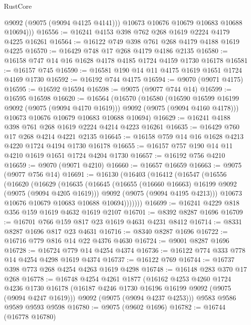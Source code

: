 \begin{lexlean}{RustCore}
\begin{coremodule}
            @9092
            (@9075 (@9094 @4125 @4141)))
          @10673
          @10676
          @10679
          @10683
          @10688
          @10694)))
@16556 := @16241 @4153 @398 @762 @268 @1619 @2224 @4179 @4225 @16261
@16564 := @16122 @749 @398 @761 @268 @4179 @4188 @1619 @4225
@16570 := @16429 @748 @17 @268 @4179 @4186 @2135
@16580 := @16158 @747 @14 @16 @1628 @4178 @4185 @1724 @4159 @1730 @16178
@16581 := @16157 @745
@16590 := @16581 @190 @14 @11 @4175 @1619 @1651 @1724 @4169 @1730
@16592 := @16192 @744 @4175
@16594 := @9070 (@9071 @4175)
@16595 := @16592 @16594
@16598 := @9075 (@9077 @744 @14)
@16599 := @16595 @16598
@16620 := @16564
    (@16570
      (@16580
        (@16590 @16599 @16199 @9092 (@9075 (@9094 @4170 @1619)))
        @9092
        (@9075 (@9094 @4160 @4178)))
      @10673
      @10676
      @10679
      @10683
      @10688
      @10694)
@16629 := @16241 @4188 @398 @761 @268 @1619 @2224 @4214 @4223 @16261
@16635 := @16429 @760 @17 @268 @4214 @4221 @2135
@16645 := @16158 @759 @14 @16 @1628 @4213 @4220 @1724 @4194 @1730 @16178
@16655 := @16157 @757 @190 @14 @11 @4210 @1619 @1651 @1724 @4204 @1730
@16657 := @16192 @756 @4210
@16659 := @9070 (@9071 @4210)
@16660 := @16657 @16659
@16663 := @9075 (@9077 @756 @14)
@16691 := @16130
    (@16403
      (@16412
        (@16547
          (@16556
            (@16620
              (@16629
                (@16635
                  (@16645
                    (@16655 (@16660 @16663) @16199 @9092 (@9075 (@9094 @4205 @1619)))
                    @9092
                    (@9075 (@9094 @4195 @4213)))
                  @10673
                  @10676
                  @10679
                  @10683
                  @10688
                  @10694)))))))
@16699 := @16241 @4229 @818 @356 @159 @1619 @4632 @1619 @2107
@16701 := @8392 @8287 @1696
@16709 := @16701 @766 @159 @817 @23 @1619 @4631 @4231 @8412
@16714 := @8331 @8287 @1696 @817 @23 @4631
@16716 := @8340 @8287 @1696
@16722 := @16716 @779 @816 @14 @22 @4376 @4630
@16724 := @9001 @8287 @1696
@16728 := @16724 @779 @14 @4254 @4374
@16736 := @16122 @774 @333 @778 @14 @4254 @4298 @1619 @4374
@16737 := @16122 @769
@16744 := @16737 @398 @773 @268 @4254 @4263 @1619 @4298
@16748 := @16148 @283 @370 @17 @268
@16778 := @16748
    @4254
    @4261
    @1877
    (@16162
      @4253
      @4260
      @1724
      @4236
      @1730
      @16178
      (@16187 @4246 @1730 @16196 @16199 @9092 (@9075 (@9094 @4247 @1619)))
      @9092
      (@9075 (@9094 @4237 @4253)))
    @9583
    @9586
    @9589
    @9593
    @9598
@16780 := @9075 (@9602 @1696)
@16782 := @16744 (@16778 @16780)

\end{coremodule}
\end{lexlean}
